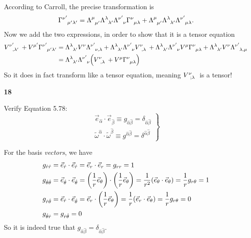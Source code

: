 \documentclass[gr-notes.tex]{subfiles}
\begin{document}
According to Carroll, the precise transformation is
%
\begin{displaymath}
  \tensor{\Gamma}{^{\nu'}_{\mu'\lambda'}} =
  \tensor{\Lambda}{^\mu_{\mu'}}
  \tensor{\Lambda}{^\lambda_{\lambda'}}
  \tensor{\Lambda}{^{\nu'}_\nu}
  \tensor{\Gamma}{^\nu_{\mu\lambda}} +
  \tensor{\Lambda}{^\mu_{\mu'}}
  \tensor{\Lambda}{^\lambda_{\lambda'}}
  \tensor{\Lambda}{^{\nu'}_{\mu\lambda}}.
\end{displaymath}
%
Now we add the two expressions, in order to show that it is a tensor equation
%
\begin{align*}
  \tensor{V}{^{\nu'}_{,\lambda'}} +
  V^{\mu'} \tensor{\Gamma}{^{\nu'}_{\mu'\lambda'}} &=
  \tensor{\Lambda}{^\lambda_{\lambda'}}
  V^\nu \tensor{\Lambda}{^{\nu'}_{\nu,\lambda}} +
  \tensor{\Lambda}{^\lambda_{\lambda'}}
  \tensor{\Lambda}{^{\nu'}_\nu} \tensor{V}{^\nu_{,\lambda}} +
  \tensor{\Lambda}{^\lambda_{\lambda'}}
  \tensor{\Lambda}{^{\nu'}_\nu} V^\mu
  \tensor{\Gamma}{^\nu_{\mu\lambda}} +
  \tensor{\Lambda}{^\lambda_{\lambda'}}
  V^\nu \tensor{\Lambda}{^{\nu'}_{\lambda,\mu}}
  \\ &=
  \tensor{\Lambda}{^\lambda_{\lambda'}}
  \tensor{\Lambda}{^{\nu'}_\nu}
  \qty(
    \tensor{V}{^\nu_{,\lambda}} +
    V^\mu \tensor{\Gamma}{^\nu_{\mu\lambda}}
  )
\end{align*}
%
So it does in fact transform like a tensor equation, meaning $\tensor{V}{^\nu_{;\lambda}}$ is a tensor!


\textbf{18}

Verify Equation 5.78:
%
\begin{displaymath}
  \left.
  \begin{array}{r}
    \vec{e}_{\hat\alpha} \cdot \vec{e}_{\hat\beta} \equiv
    g_{\hat\alpha \hat\beta} =
    \delta_{\hat\alpha \hat\beta}
    \\
    \tilde\omega^{\hat\alpha} \cdot \tilde\omega^{\hat\beta} \equiv
    g^{\hat\alpha \hat\beta} =
    \delta^{\hat\alpha \hat\beta}
  \end{array}
  \right\}
\end{displaymath}

For the basis \emph{vectors}, we have
%
\begin{align*}
  g_{\hat{r} \hat{r}} &=
  \vec{e}_{\hat{r}} \cdot \vec{e}_{\hat{r}} =
  \vec{e}_r \cdot \vec{e}_r =
  g_{rr} =
  1
  \\
  g_{\hat\theta \hat\theta} &=
  \vec{e}_{\hat\theta} \cdot \vec{e}_{\hat\theta} =
  \qty(\frac{1}{r} \vec{e}_\theta) \cdot \qty(\frac{1}{r} \vec{e}_\theta) =
  \frac{1}{r^2} (\vec{e}_\theta \cdot \vec{e}_\theta) =
  \frac{1}{r} g_{r\theta} =
  1
  \\
  g_{\hat{r} \hat\theta} &=
  \vec{e}_{\hat{r}} \cdot \vec{e}_{\hat\theta} =
  \vec{e}_r \cdot \qty(\frac{1}{r} \vec{e}_\theta) =
  \frac{1}{r} (\vec{e}_r \cdot \vec{e}_\theta) =
  \frac{1}{r} g_{r\theta} =
  0
  \\
  g_{\hat\theta \hat{r}} &=
  g_{\hat{r} \hat\theta} =
  0
\end{align*}
%
So it is indeed true that $g_{\hat\alpha \hat\beta} = \delta_{\hat\alpha \hat\beta}$.
\end{document}
